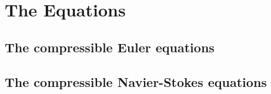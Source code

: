 \documentclass{article}
\begin{document}

\section{The Equations}

\subsection{The compressible Euler equations} \label{sec:compressibleEuler}



\subsection{The compressible Navier-Stokes equations} \label{sec:compressibleNS}
\end{document}
